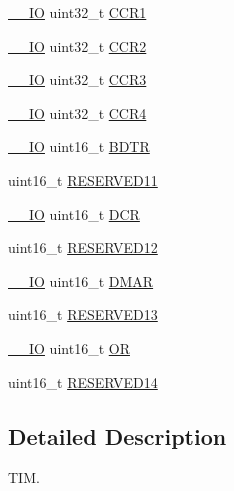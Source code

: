 \begin{DoxyCompactItemize}
\item 
\hyperlink{core__cm4_8h_aec43007d9998a0a0e01faede4133d6be}{\+\_\+\+\_\+\+IO} uint32\+\_\+t \hyperlink{struct_t_i_m___type_def_a0dd9c06729a5eb6179c6d0d60faca7ed}{C\+C\+R1}
\item 
\hyperlink{core__cm4_8h_aec43007d9998a0a0e01faede4133d6be}{\+\_\+\+\_\+\+IO} uint32\+\_\+t \hyperlink{struct_t_i_m___type_def_a4d1171e9a61538424b8ef1f2571986d0}{C\+C\+R2}
\item 
\hyperlink{core__cm4_8h_aec43007d9998a0a0e01faede4133d6be}{\+\_\+\+\_\+\+IO} uint32\+\_\+t \hyperlink{struct_t_i_m___type_def_ac83441bfb8d0287080dcbd945a272a74}{C\+C\+R3}
\item 
\hyperlink{core__cm4_8h_aec43007d9998a0a0e01faede4133d6be}{\+\_\+\+\_\+\+IO} uint32\+\_\+t \hyperlink{struct_t_i_m___type_def_a5ba381c3f312fdf5e0b4119641b3b0aa}{C\+C\+R4}
\item 
\hyperlink{core__cm4_8h_aec43007d9998a0a0e01faede4133d6be}{\+\_\+\+\_\+\+IO} uint16\+\_\+t \hyperlink{struct_t_i_m___type_def_a32bbedb8b418359c6873375ec949cf8b}{B\+D\+TR}
\item 
uint16\+\_\+t \hyperlink{struct_t_i_m___type_def_a7a96436f300141eb48768ffa90ee6e71}{R\+E\+S\+E\+R\+V\+E\+D11}
\item 
\hyperlink{core__cm4_8h_aec43007d9998a0a0e01faede4133d6be}{\+\_\+\+\_\+\+IO} uint16\+\_\+t \hyperlink{struct_t_i_m___type_def_ad3186a43824621f049e7eff37c88ad4e}{D\+CR}
\item 
uint16\+\_\+t \hyperlink{struct_t_i_m___type_def_a994061b8b26ae9b2e8ddb981cb3eec11}{R\+E\+S\+E\+R\+V\+E\+D12}
\item 
\hyperlink{core__cm4_8h_aec43007d9998a0a0e01faede4133d6be}{\+\_\+\+\_\+\+IO} uint16\+\_\+t \hyperlink{struct_t_i_m___type_def_a4e0fbb52e6dd4bdabcb3f3b2f4bae40c}{D\+M\+AR}
\item 
uint16\+\_\+t \hyperlink{struct_t_i_m___type_def_a5a831b0a42a5428fbbfd550b7a9c8108}{R\+E\+S\+E\+R\+V\+E\+D13}
\item 
\hyperlink{core__cm4_8h_aec43007d9998a0a0e01faede4133d6be}{\+\_\+\+\_\+\+IO} uint16\+\_\+t \hyperlink{struct_t_i_m___type_def_a145760563b46fcdeedddf7c92ee68d61}{OR}
\item 
uint16\+\_\+t \hyperlink{struct_t_i_m___type_def_a548510ebbe395a3947dbbc49fcccec0d}{R\+E\+S\+E\+R\+V\+E\+D14}
\end{DoxyCompactItemize}


\subsection{Detailed Description}
T\+IM. 

